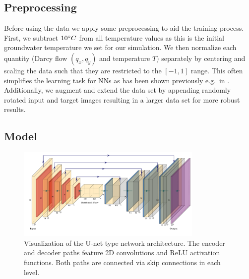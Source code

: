 \documentclass{article} %
\begin{document}

\subsection*{Preprocessing}
Before using the data we apply some preprocessing to aid the training process.
First, we subtract $10 \degree C$ from all temperature values as this is the initial groundwater temperature we set for our simulation.
We then normalize each quantity (Darcy flow $(q_x, q_y)$ and temperature $T$) separately by centering and scaling the data such that they are restricted to the $[-1, 1]$ range.
This often simplifies the learning task for NNs as has been shown previously e.g.\  in \citep{LeCun2012,Wiesler2011}.
Additionally, we augment and extend the data set by appending randomly rotated input and target images resulting in a larger data set for more robust results.


\subsection*{Model}
\begin{figure}[!htb]
   \centering
   \includegraphics[width=0.8\textwidth]{img/arch.pdf}
   \caption{Visualization of the U-net type network architecture. The encoder and decoder paths feature 2D convolutions and ReLU activation functions. Both paths are connected via skip connections in each level.}
   \label{fig:arch}
\end{figure}
\end{document}

